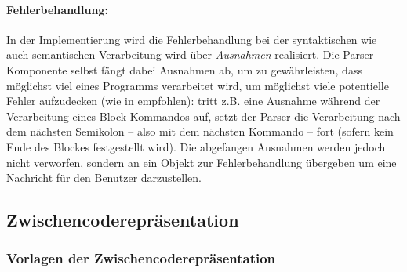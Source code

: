 \documentclass[twoside,a4paper,fleqn,12pt]{article}
\begin{document}
%   

\paragraph{Fehlerbehandlung:}
In der Implementierung wird die Fehlerbehandlung bei der syntaktischen wie auch semantischen Verarbeitung wird über \emph{Ausnahmen}
realisiert. Die Parser-Komponente selbst fängt dabei Ausnahmen ab, um zu gewährleisten, dass möglichst viel eines
Programms verarbeitet wird, um möglichst viele potentielle Fehler aufzudecken (wie in \cite{wirth_compiler} empfohlen):
tritt z.B. eine Ausnahme während der Verarbeitung eines Block-Kommandos auf, setzt der Parser die
Verarbeitung nach dem nächsten Semikolon -- also mit dem nächsten Kommando -- fort (sofern kein Ende
des Blockes festgestellt wird).
Die abgefangen Ausnahmen werden jedoch nicht verworfen, sondern an ein Objekt zur Fehlerbehandlung
übergeben um eine Nachricht für den Benutzer darzustellen.



\subsection{Zwischencoderepräsentation}
\label{zcr}




\subsubsection{Vorlagen der Zwischencoderepräsentation}
\end{document}
